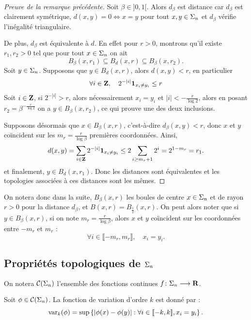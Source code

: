   \begin{proof}[Preuve de la remarque précédente]
    Soit $\beta \in ]0, 1[$. Alors $d_{\beta}$ est distance car $d_{\beta}$ est clairement symétrique, $d(x, y) = 0 \iff x = y$ pour tout $x,y\in\Sigma_n$
    et $d_{\beta}$ vérifie l'inégalité triangulaire.

    De plus, $d_{\beta}$ est équivalente à $d$. En effet pour $r > 0$, montrons qu'il existe $r_1, r_2 > 0$ tel que pour tout $x \in \Sigma_n$ on ait
    $$B_{\beta}(x, r_1) \subseteq  B_d(x, r) \subseteq B_{\beta}(x, r_2).$$
    Soit $y \in \Sigma_n$. Supposons que $y \in B_d(x, r)$, alors $d(x, y) < r$, en particulier
    $$\forall i \in \mathbf Z, \hspace{1em}2^{-|i|}\mathbf{1}_{x_i \not= y_i} \leq r$$
    Soit $i \in \mathbf Z$, si $2^{-|i|} > r$, alors nécessairement $x_i = y_i$ et $|i| < -\frac{r}{\log{2}}$,
    alors en posant $r_2 = \beta^{-\frac{r}{\log{2}}}$ on a $y \in B_{\beta}(x, r_2)$, ce qui prouve une des deux inclusions.

    Supposons désormais que $x \in B_{\beta}(x, r)$, c'est-à-dire $d_{\beta}(x, y) < r$,
    donc $x$ et $y$ coïncident sur les $m_r = \frac{r}{\log{\beta}}$ premières coordonnées.
    Ainsi,
    $$d(x, y) = \sum_{i\in\mathbf Z}{2^{-|i|}\mathbf{1}_{x_i \not= y_i}} \leq 2\sum_{i \geq m_r + 1}{2^i} = 2^{1 - m_r} = r_1.$$
    et finalement, $y \in B_d(x, r_1)$. Donc les distances sont équivalentes et les topologies associées à ces distances sont les mêmes.
  \end{proof}

  On notera donc dans la suite, $B_{\beta}(x, r)$ les boules de centre $x \in \Sigma_n$ et de rayon $r > 0$ pour la distance $d_{\beta}$,
  et $B(x, r) = B_{\frac 1 2}(x, r)$.
  On peut alors noter que si $y \in B_{\beta}(x, r)$, si on note $m_r = \frac{r}{\log{\beta}}$, alors $x$ et $y$ coïncident sur les coordonnées entre
  $-m_r$ et $m_r$ :
  $$\forall i \in \llbracket -m_r, m_r \rrbracket, \hspace{1em} x_i = y_i.$$

  \subsection{Propriétés topologiques de $\Sigma_n$}

  On notera $\mathcal{C} (\Sigma_{n})$ l'ensemble des fonctions continues $f \colon \Sigma_n \longrightarrow \mathbf R$.

  \begin{definition}
    \label{def:var_potentiel}
    \leanok
    Soit $\phi \in \mathcal{C} (\Sigma_{n})$. La fonction de variation d'ordre $k$ est donné par :
    $$\operatorname{var}_k(\phi) = \sup\left\{|\phi(x) - \phi(y)| : \forall i \in [\![ -k, k]\!], x_i = y_i \right\}.$$
  \end{definition}

